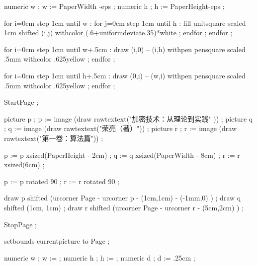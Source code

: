 
    numeric w ; w := PaperWidth -eps ; %
    numeric h ; h := PaperHeight-eps ; %

    for i=0cm step 1cm until w  :
        for j=0cm step 1cm until h :
            fill unitsquare scaled 1cm shifted (i,j) withcolor (.6+uniformdeviate.35)*white ;
        endfor ;
    endfor ;


    for i=0cm step 1cm until w+.5cm :
        draw (i,0) -- (i,h) withpen pensquare scaled .5mm withcolor .625yellow ;
    endfor ;

    for i=0cm step 1cm until h+.5cm :
        draw (0,i) -- (w,i) withpen pensquare scaled .5mm withcolor .625yellow ;
    endfor ;

\stopuseMPgraphic


    StartPage ;


        picture p ; p := image (draw rawtextext("\darkred 加密技术：从理论到实践"   )) ;
        picture q ; q := image (draw rawtextext("\darkred{}荣亮（著）")) ;
        picture r ; r := image (draw rawtextext("\darkred{}第一卷：算法篇")) ;

        p := p xsized(PaperHeight - 2cm) ;
        q := q xsized(PaperWidth  - 8cm) ;
        r := r xsized(6cm) ;

        p := p rotated 90 ;
        r := r rotated 90 ;

        draw p shifted (urcorner Page - urcorner p - (1cm,1cm) - (-1mm,0) ) ;
        draw q shifted (1cm, 1cm) ;
        draw r shifted (urcorner Page - urcorner r - (5cm,2cm) ) ;

    StopPage ;

    setbounds currentpicture to Page ;

\stopuseMPgraphic



\stopuseMPgraphic


    numeric w ; w := \overlaywidth ;
    numeric h ; h := \overlayheight ;
    numeric d ; d := .25cm ;

